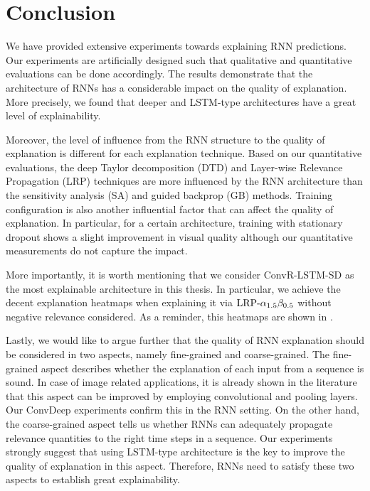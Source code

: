 \chapter{Conclusion}
\label{cha:chapter5}
We have provided extensive experiments towards explaining RNN predictions. Our experiments are artificially designed such that qualitative and quantitative evaluations can be done accordingly.  The results demonstrate that the architecture of RNNs has a considerable impact on the quality of explanation. More precisely, we found that deeper and LSTM-type architectures have a great level of explainability.

Moreover, the level of influence from the RNN structure to the quality of explanation is different for each explanation technique. Based on our quantitative evaluations, the deep Taylor decomposition (DTD) and Layer-wise Relevance Propagation (LRP) techniques are more influenced by the RNN architecture than the sensitivity analysis (SA) and guided backprop (GB) methods.  Training configuration is also another influential factor that can affect the quality of explanation. In particular, for a certain architecture, training with stationary dropout shows a slight improvement in visual quality although our quantitative measurements do not capture the impact.

More importantly, it is worth mentioning that we consider ConvR-LSTM-SD as the most explainable architecture in this thesis. In particular, we achieve the decent explanation heatmaps when explaining it via $\text{LRP-}\alpha_{1.5}\beta_{0.5}$ without negative relevance considered. As a reminder, this heatmaps are shown in \addfigure{\ref{fig:heatmap_msc_convrlstm_pos_rel}}.

Lastly, we would like to argue further that the quality of RNN explanation should be considered in two aspects, namely fine-grained and coarse-grained.  The fine-grained aspect describes whether the explanation of each input from a sequence is sound. In case of image related applications, it is already shown in the literature that this aspect can be improved by employing convolutional and pooling layers. Our ConvDeep experiments confirm this in the RNN setting. On the other hand, the coarse-grained aspect tells us whether RNNs can adequately propagate relevance quantities to the right time steps in a sequence. Our experiments strongly suggest that using LSTM-type architecture is the key to improve the quality of explanation in this aspect. Therefore, RNNs need to satisfy these two aspects to establish great explainability.



